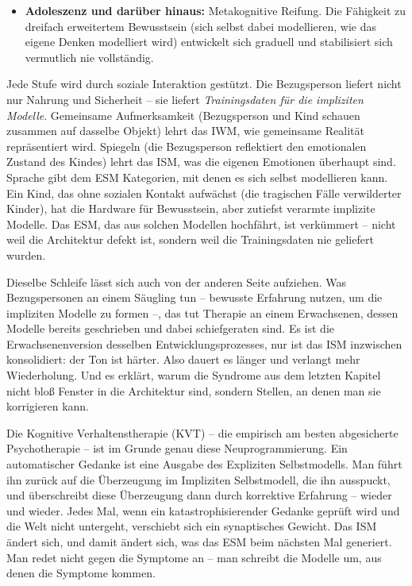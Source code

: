 \documentclass[11pt, twoside, openright]{book}
\begin{document}
\begin{itemize}
  \item \textbf{Adoleszenz und darüber hinaus:} Metakognitive Reifung. Die Fähigkeit zu dreifach erweitertem Bewusstsein (sich selbst dabei modellieren, wie das eigene Denken modelliert wird) entwickelt sich graduell und stabilisiert sich vermutlich nie vollständig.
\end{itemize}

Jede Stufe wird durch soziale Interaktion gestützt. Die Bezugsperson liefert nicht nur Nahrung und Sicherheit -- sie liefert \textit{Trainingsdaten für die impliziten Modelle}. Gemeinsame Aufmerksamkeit (Bezugsperson und Kind schauen zusammen auf dasselbe Objekt) lehrt das IWM, wie gemeinsame Realität repräsentiert wird. Spiegeln (die Bezugsperson reflektiert den emotionalen Zustand des Kindes) lehrt das ISM, was die eigenen Emotionen überhaupt sind. Sprache gibt dem ESM Kategorien, mit denen es sich selbst modellieren kann. Ein Kind, das ohne sozialen Kontakt aufwächst (die tragischen Fälle verwilderter Kinder), hat die Hardware für Bewusstsein, aber zutiefst verarmte implizite Modelle. Das ESM, das aus solchen Modellen hochfährt, ist verkümmert -- nicht weil die Architektur defekt ist, sondern weil die Trainingsdaten nie geliefert wurden.

Dieselbe Schleife lässt sich auch von der anderen Seite aufziehen. Was Bezugspersonen an einem Säugling tun -- bewusste Erfahrung nutzen, um die impliziten Modelle zu formen --, das tut Therapie an einem Erwachsenen, dessen Modelle bereits geschrieben und dabei schiefgeraten sind. Es ist die Erwachsenenversion desselben Entwicklungsprozesses, nur ist das ISM inzwischen konsolidiert: der Ton ist härter. Also dauert es länger und verlangt mehr Wiederholung. Und es erklärt, warum die Syndrome aus dem letzten Kapitel nicht bloß Fenster in die Architektur sind, sondern Stellen, an denen man sie korrigieren kann.

Die Kognitive Verhaltenstherapie (KVT) -- die empirisch am besten abgesicherte Psychotherapie -- ist im Grunde genau diese Neuprogrammierung. Ein automatischer Gedanke ist eine Ausgabe des Expliziten Selbstmodells. Man führt ihn zurück auf die Überzeugung im Impliziten Selbstmodell, die ihn ausspuckt, und überschreibt diese Überzeugung dann durch korrektive Erfahrung -- wieder und wieder. Jedes Mal, wenn ein katastrophisierender Gedanke geprüft wird und die Welt nicht untergeht, verschiebt sich ein synaptisches Gewicht. Das ISM ändert sich, und damit ändert sich, was das ESM beim nächsten Mal generiert. Man redet nicht gegen die Symptome an -- man schreibt die Modelle um, aus denen die Symptome kommen.
\end{document}
